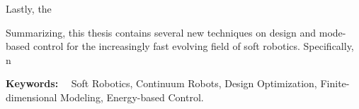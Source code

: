 Lastly, the

Summarizing, this thesis contains several new techniques on design and mode-based control for the increasingly fast evolving field of soft robotics. Specifically, n




\vspace*{11pt}\noindent
\textbf{Keywords:} \ \ Soft Robotics, Continuum Robots, Design Optimization, Finite-dimensional Modeling, Energy-based Control.
